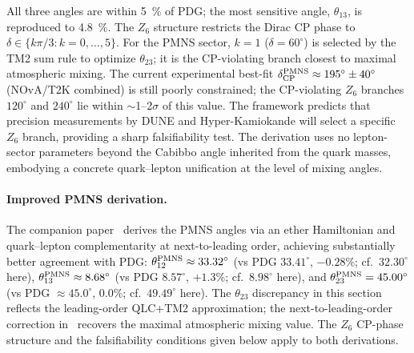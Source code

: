 \documentclass[11pt]{article}
\theoremstyle{remark}
\begin{document}
\noindent All three angles are within \SI{5}{\percent} of PDG; the most sensitive angle, $\theta_{13}$, is reproduced to \SI{4.8}{\percent}.
The $Z_6$ structure restricts the Dirac CP phase to $\delta \in \{k\pi/3 : k = 0,\ldots,5\}$.
For the PMNS sector, $k{=}1$ ($\delta = 60^\circ$) is selected by the TM2 sum rule to optimize $\theta_{23}$; it is the CP-violating branch closest to maximal atmospheric mixing.
The current experimental best-fit $\delta_{\rm CP}^{\rm PMNS} \approx 195^\circ \pm 40^\circ$ (NOvA/T2K combined) is still poorly constrained; the CP-violating $Z_6$ branches $120^\circ$ and $240^\circ$ lie within $\sim$1--2$\sigma$ of this value.
The framework predicts that precision measurements by DUNE and Hyper-Kamiokande will select a specific $Z_6$ branch, providing a sharp falsifiability test.
The derivation uses no lepton-sector parameters beyond the Cabibbo angle inherited from the quark masses, embodying a concrete quark--lepton unification at the level of mixing angles.

\paragraph{Improved PMNS derivation.}
The companion paper~\cite{SpivackDeeperConsequences} derives the PMNS angles via an ether Hamiltonian and quark--lepton complementarity at next-to-leading order, achieving substantially better agreement with PDG: $\theta_{12}^{\rm PMNS} \approx 33.32^\circ$ (vs PDG $33.41^\circ$, $-0.28\%$; cf.\ $32.30^\circ$ here), $\theta_{13}^{\rm PMNS} \approx 8.68^\circ$ (vs PDG $8.57^\circ$, $+1.3\%$; cf.\ $8.98^\circ$ here), and $\theta_{23}^{\rm PMNS} = 45.00^\circ$ (vs PDG $\approx 45.0^\circ$, $0.0\%$; cf.\ $49.49^\circ$ here).
The $\theta_{23}$ discrepancy in this section reflects the leading-order QLC+TM2 approximation; the next-to-leading-order correction in~\cite{SpivackDeeperConsequences} recovers the maximal atmospheric mixing value.  The $Z_6$ CP-phase structure and the falsifiability conditions given below apply to both derivations.
\end{document}
